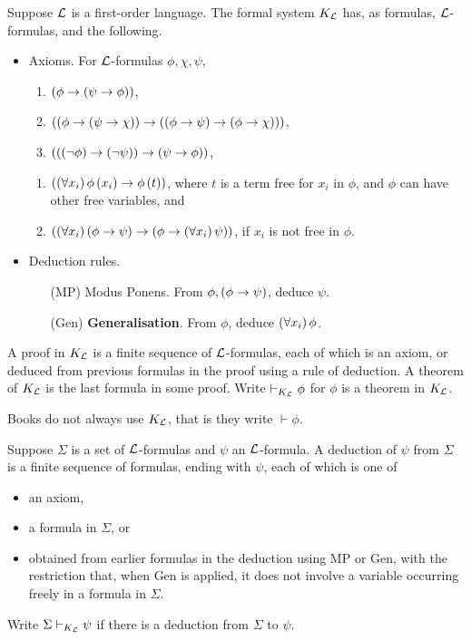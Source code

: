 \begin{definition}
Suppose $ \mathcal{L} $ is a first-order language. The formal system $ K_{\mathcal{L}} $ has, as formulas, $ \mathcal{L} $-formulas, and the following.
\begin{itemize}
\item Axioms. For $ \mathcal{L} $-formulas $ \phi, \chi, \psi $,
\begin{enumerate}[label=(A\arabic*)]
\item $ \left( \phi \rightarrow \left( \psi \rightarrow \phi \right) \right) $,
\item $ \left( \left( \phi \rightarrow \left( \psi \rightarrow \chi \right) \right) \rightarrow \left( \left( \phi \rightarrow \psi \right) \rightarrow \left( \phi \rightarrow \chi \right) \right) \right) $,
\item $ \left( \left( \left( \neg \phi \right) \rightarrow \left( \neg \psi \right) \right) \rightarrow \left( \psi \rightarrow \phi \right) \right) $,
\end{enumerate}
\begin{enumerate}[label=(K\arabic*)]
\item $ \left( \left( \forall x_i \right)\phi\left( x_i \right) \rightarrow \phi\left( t \right) \right) $, where $ t $ is a term free for $ x_i $ in $ \phi $, and $ \phi $ can have other free variables, and
\item $ \left( \left( \forall x_i \right)\left( \phi \rightarrow \psi \right) \rightarrow \left( \phi \rightarrow \left( \forall x_i \right)\psi \right) \right) $, if $ x_i $ is not free in $ \phi $.
\end{enumerate}
\item Deduction rules.
\begin{itemize}
\item[(MP)] Modus Ponens. From $ \phi, \left( \phi \rightarrow \psi \right) $, deduce $ \psi $.
\item[(Gen)] \textbf{Generalisation}. From $ \phi $, deduce $ \left( \forall x_i \right)\phi $.
\end{itemize}
\end{itemize}
A proof in $ K_{\mathcal{L}} $ is a finite sequence of $ \mathcal{L} $-formulas, each of which is an axiom, or deduced from previous formulas in the proof using a rule of deduction. A theorem of $ K_{\mathcal{L}} $ is the last formula in some proof. Write $ \vdash_{K_{\mathcal{L}}} \phi $ for $ \phi $ is a theorem in $ K_{\mathcal{L}} $.
\end{definition}

\begin{note*}
Books do not always use $ K_{\mathcal{L}} $, that is they write $ \vdash \phi $.
\end{note*}

\pagebreak

\begin{definition}
Suppose $ \Sigma $ is a set of $ \mathcal{L} $-formulas and $ \psi $ an $ \mathcal{L} $-formula. A deduction of $ \psi $ from $ \Sigma $ is a finite sequence of formulas, ending with $ \psi $, each of which is one of
\begin{itemize}
\item an axiom,
\item a formula in $ \Sigma $, or
\item obtained from earlier formulas in the deduction using MP or Gen, with the restriction that, when Gen is applied, it does not involve a variable occurring freely in a formula in $ \Sigma $.
\end{itemize}
Write $ \Sigma \vdash_{K_{\mathcal{L}}} \psi $ if there is a deduction from $ \Sigma $ to $ \psi $.
\end{definition}


